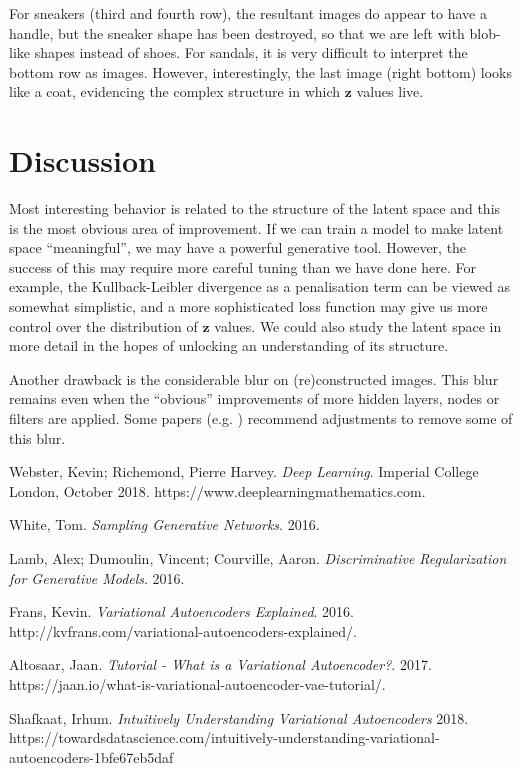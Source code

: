 \documentclass[]{article}
\begin{document}
For sneakers (third and fourth row), the resultant images do appear to have a handle, but the sneaker shape has been destroyed, so that we are left with blob-like shapes instead of shoes. For sandals, it is very difficult to interpret the bottom row as images. However, interestingly, the last image (right bottom) looks like a coat, evidencing the complex structure in which $\bm{z}$ values live.




\section{Discussion}
\label{sec:discussion}

Most interesting behavior is related to the structure of the latent space and this is the most obvious area of improvement. If we can train a model to make latent space ``meaningful'', we may have a powerful generative tool. However, the success of this may require more careful tuning than we have done here. For example, the Kullback-Leibler divergence as a penalisation term can be viewed as somewhat simplistic, and a more sophisticated loss function may give us more control over the distribution of $\bm{z}$ values. We could also study the latent space in more detail in the hopes of unlocking an understanding of its structure.

Another drawback is the considerable blur on (re)constructed images. This blur remains even when the ``obvious'' improvements of more hidden layers, nodes or filters are applied. Some papers (e.g. \cite{lamb}) recommend adjustments to remove some of this blur.




\begin{thebibliography}{9}
          
  Webster, Kevin; Richemond, Pierre Harvey.
  \textit{Deep Learning}.
  Imperial College London, October 2018.
  https://www.deeplearningmathematics.com.

  White, Tom.
  \textit{Sampling Generative Networks}.
  2016.
  
  Lamb, Alex; Dumoulin, Vincent; Courville, Aaron.
  \textit{Discriminative Regularization for Generative Models}.
  2016.

  Frans, Kevin.
  \textit{Variational Autoencoders Explained}.
  2016.
  http://kvfrans.com/variational-autoencoders-explained/.

  Altosaar, Jaan.
  \textit{Tutorial - What is a Variational Autoencoder?}.
  2017.
  https://jaan.io/what-is-variational-autoencoder-vae-tutorial/.

  Shafkaat, Irhum.
  \textit{Intuitively Understanding Variational Autoencoders}
  2018.
  https://towardsdatascience.com/intuitively-understanding-variational-autoencoders-1bfe67eb5daf
  
  
\end{thebibliography}
\end{document}
